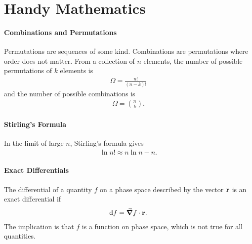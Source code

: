 \section{Handy Mathematics}

\paragraph{Combinations and Permutations}
Permutations are sequences of some kind. Combinations are permutations where order does not matter. From a collection of $n$ elements, the number of possible permutations of $k$ elements is
\begin{align*}
\Omega = \frac{n!}{(n - k)!}
\end{align*}
and the number of possible combinations is
\begin{align*}
\Omega = \binom{n}{k}.
\end{align*}

\paragraph{Stirling's Formula}
In the limit of large $n$, Stirling's formula gives
\begin{align*}
	\ln{n!}\approx n\ln{n} - n.
\end{align*}

\paragraph{Exact Differentials}
The differential of a quantity $f$ on a phase space described by the vector $\vb{r}$ is an exact differential if
\begin{align*}
	\dd{f} = \grad{f}\cdot\vb{r}.
\end{align*}
The implication is that $f$ is a function on phase space, which is not true for all quantities.

